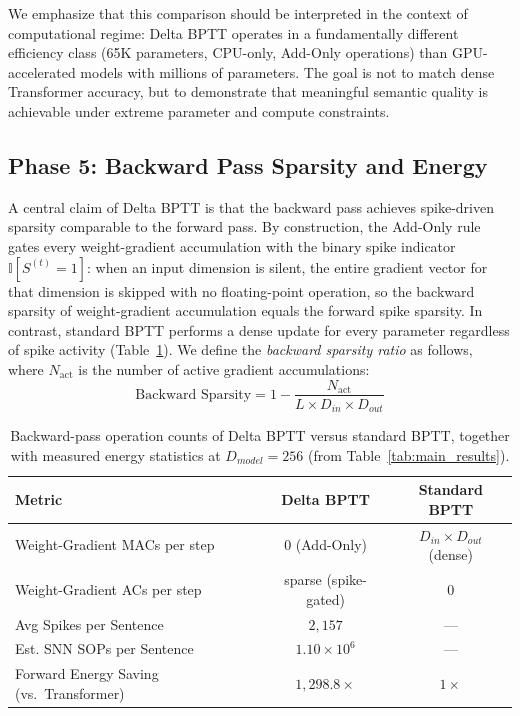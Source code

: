 \documentclass[11pt, conference, compsoc, twoside]{IEEEtran}
\begin{document}
We emphasize that this comparison should be interpreted in the context of computational regime: Delta BPTT operates in a fundamentally different efficiency class (65K parameters, CPU-only, Add-Only operations) than GPU-accelerated models with millions of parameters. The goal is not to match dense Transformer accuracy, but to demonstrate that meaningful semantic quality is achievable under extreme parameter and compute constraints.

\subsection{Phase 5: Backward Pass Sparsity and Energy}
A central claim of Delta BPTT is that the backward pass achieves spike-driven sparsity comparable to the forward pass. By construction, the Add-Only rule gates every weight-gradient accumulation with the binary spike indicator $\mathbb{I}[S^{(t)} = 1]$: when an input dimension is silent, the entire gradient vector for that dimension is skipped with no floating-point operation, so the backward sparsity of weight-gradient accumulation equals the forward spike sparsity. In contrast, standard BPTT performs a dense update for every parameter regardless of spike activity (Table~\ref{tab:sparsity}). We define the \textit{backward sparsity ratio} as follows, where $N_{\mathrm{act}}$ is the number of active gradient accumulations:
\begin{equation}
\text{Backward Sparsity} = 1 - \frac{N_{\mathrm{act}}}{L \times D_{in} \times D_{out}}
\end{equation}

\begin{table}[t]
\begin{center}
{\caption{Backward-pass operation counts of Delta BPTT versus standard BPTT, together with measured energy statistics at $D_{model}=256$ (from Table~\ref{tab:main_results}).}\label{tab:sparsity}}


\begin{tabular}{lcc}
\toprule
\textbf{Metric} & \textbf{Delta BPTT} & \textbf{Standard BPTT} \\
\midrule
Weight-Gradient MACs per step & $0$ (Add-Only) & $D_{in} \times D_{out}$ (dense) \\
Weight-Gradient ACs per step & sparse (spike-gated) & $0$ \\
Avg Spikes per Sentence & $2{,}157$ & --- \\
Est. SNN SOPs per Sentence & $1.10 \times 10^6$ & --- \\
Forward Energy Saving (vs.\ Transformer) & $1{,}298.8\times$ & $1\times$ \\
\bottomrule
\end{tabular}
\end{center}
\end{table}
\end{document}
